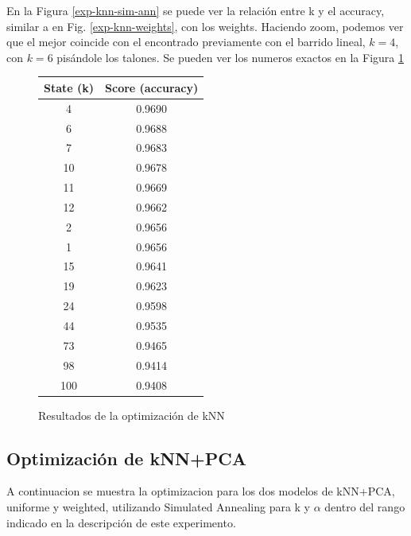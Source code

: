 \documentclass[a4paper]{article}
\begin{document}
    En la Figura \ref{exp-knn-sim-ann} se puede ver la relación entre k y el accuracy, similar a en Fig. \ref{exp-knn-weights}, con los weights. Haciendo zoom, podemos ver que el mejor coincide con el encontrado previamente con el barrido lineal, $k = 4$, con $k=6$ pisándole los talones. Se pueden ver los numeros exactos en la Figura \ref{knn-optimization-results}

    \begin{figure}[H]
        \begin{center}
        \begin{tabular}{ |c|c| } 
        \hline
        \textbf{State (k)} & \textbf{Score (accuracy)} \\
        \hline
        4 &     0.9690 \\
        6 &     0.9688 \\
        7 &     0.9683 \\
        10 &    0.9678 \\
        11 &    0.9669 \\
        12 &    0.9662 \\
        2 &     0.9656 \\
        1 &     0.9656 \\
        15 &    0.9641 \\
        19 &    0.9623 \\
        24 &    0.9598 \\
        44 &    0.9535 \\
        73 &    0.9465 \\
        98 &    0.9414 \\
        100 &   0.9408 \\
        \hline
        \end{tabular}
        \end{center}
        \caption{Resultados de la optimización de kNN}
        \label{knn-optimization-results}
    \end{figure}
    
    \subsection{Optimización de kNN+PCA}
      A continuacion se muestra la optimizacion para los dos modelos de kNN+PCA, uniforme y weighted, utilizando Simulated Annealing para k y $\alpha$ dentro del rango indicado en la descripción de este experimento.
      
\end{document}
